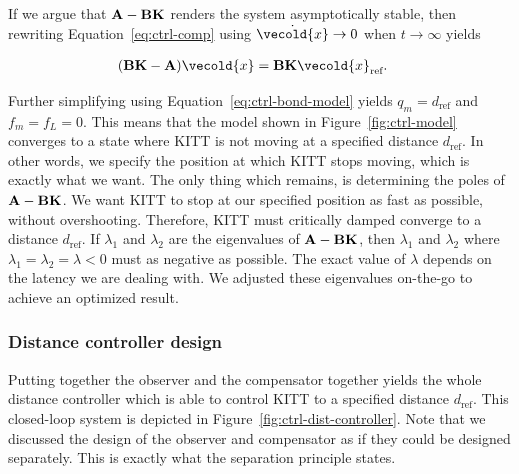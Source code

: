 \documentclass[11pt,titlepage]{report}
\let\vec\vecold
\newcommand{\vec}[1]{\mathbf{#1}}
\begin{document}
If we argue that $\mathbf{A} - \mathbf{B} \mathbf{K}$ renders the system asymptotically stable, then rewriting Equation~\ref{eq:ctrl-comp} using $\dot{\vec{x}} \to 0$ when $t \to \infty$ yields

\begin{align*}
	(\mat{B} \mat{K} - \mat{A}) \vec{x} &= \mat{B} \mat{K} \vec{x}_{\text{ref}}.
\end{align*}

Further simplifying using Equation~\ref{eq:ctrl-bond-model} yields $q_m = d_{\text{ref}}$ and $f_m = f_L = 0$. This means that the model shown in Figure~\ref{fig:ctrl-model} converges to a state where KITT is not moving at a specified distance $d_{\text{ref}}$. In other words, we specify the position at which KITT stops moving, which is exactly what we want. The only thing which remains, is determining the poles of $\mathbf{A} - \mathbf{B} \mathbf{K}$. We want KITT to stop at our specified position as fast as possible, without overshooting. Therefore, KITT must critically damped converge to a distance $d_{\text{ref}}$. If $\lambda_1$ and $\lambda_2$ are the eigenvalues of $\mathbf{A} - \mathbf{B} \mathbf{K}$, then $\lambda_1$ and $\lambda_2$ where $\lambda_1 = \lambda_2 = \lambda < 0$ must as negative as possible. The exact value of $\lambda$ depends on the latency we are dealing with. We adjusted these eigenvalues on-the-go to achieve an optimized result.

\subsubsection{Distance controller design}
Putting together the observer and the compensator together yields the whole distance controller which is able to control KITT to a specified distance $d_{\text{ref}}$. This closed-loop system is depicted in Figure~\ref{fig:ctrl-dist-controller}. Note that we discussed the design of the observer and compensator as if they could be designed separately. This is exactly what the separation principle states. 
\end{document}
